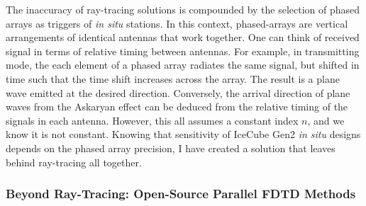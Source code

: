 \documentclass[../../../main.tex]{subfiles}
\begin{document}
\vspace{0.25cm}
The inaccuracy of ray-tracing solutions is compounded by the selection of phased arrays as triggers of \textit{in situ} stations.  In this context, phased-arrays are vertical arrangements of identical antennas that work together.  One can think of received signal in terms of relative timing between antennas.  For example, in transmitting mode, the each element of a phased array radiates the same signal, but shifted in time such that the time shift increases across the array.  The result is a plane wave emitted at the desired direction.  Conversely, the arrival direction of plane waves from the Askaryan effect can be deduced from the relative timing of the signals in each antenna. However, this all assumes a constant index $n$, and we know it is not constant.  Knowing that sensitivity of IceCube Gen2 \textit{in situ} designs depends on the phased array precision, I have created a solution that leaves behind ray-tracing all together.

\subsubsection{Beyond Ray-Tracing: Open-Source Parallel FDTD Methods}
\label{sec:cem_cluster}
\end{document}
